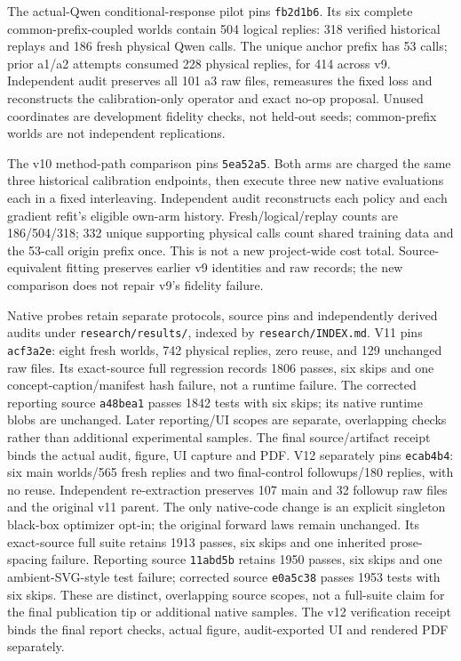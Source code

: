 \documentclass{article}
\newcommand{\code}[1]{\texttt{#1}}
\begin{document}
The actual-Qwen conditional-response pilot pins \code{fb2d1b6}. Its six complete
common-prefix-coupled worlds contain 504 logical replies: 318 verified historical
replays and 186 fresh physical Qwen calls. The unique anchor prefix has 53 calls;
prior a1/a2 attempts consumed 228 physical replies, for 414 across v9. Independent
audit preserves all 101 a3 raw files, remeasures the fixed loss and reconstructs
the calibration-only operator and exact no-op proposal. Unused coordinates are
development fidelity checks, not held-out seeds; common-prefix worlds are not
independent replications.

The v10 method-path comparison pins \code{5ea52a5}. Both arms are charged the
same three historical calibration endpoints, then execute three new native
evaluations each in a fixed interleaving. Independent audit reconstructs each
policy and each gradient refit's eligible own-arm history. Fresh/logical/replay
counts are 186/504/318; 332 unique supporting physical calls count shared
training data and the 53-call origin prefix once. This is not a new project-wide
cost total. Source-equivalent fitting preserves earlier v9 identities and raw
records; the new comparison does not repair v9's fidelity failure.

Native probes retain separate protocols, source pins and independently derived
audits under \code{research/results/}, indexed by \code{research/INDEX.md}.
V11 pins \code{acf3a2e}: eight fresh worlds, 742 physical replies, zero reuse,
and 129 unchanged raw files. Its exact-source full regression records 1806 passes,
six skips and one concept-caption/manifest hash failure, not a runtime failure.
The corrected reporting source \code{a48bea1} passes 1842 tests with six skips;
its native runtime blobs are unchanged. Later reporting/UI scopes are separate,
overlapping checks rather than additional experimental samples. The final
source/artifact receipt binds the actual audit, figure, UI capture and PDF.
V12 separately pins \code{ecab4b4}: six main worlds/565 fresh replies and two
final-control followups/180 replies, with no reuse. Independent re-extraction
preserves 107 main and 32 followup raw files and the original v11 parent.
The only native-code change is an explicit singleton black-box optimizer
opt-in; the original forward laws remain unchanged. Its exact-source full
suite retains 1913 passes, six skips and one inherited prose-spacing failure.
Reporting source \code{11abd5b} retains 1950 passes, six skips and one
ambient-SVG-style test failure; corrected source \code{e0a5c38} passes 1953
tests with six skips. These are distinct, overlapping source scopes, not a
full-suite claim for the final publication tip or additional native samples.
The v12 verification receipt binds the final report checks, actual figure,
audit-exported UI and rendered PDF separately.
\end{document}
